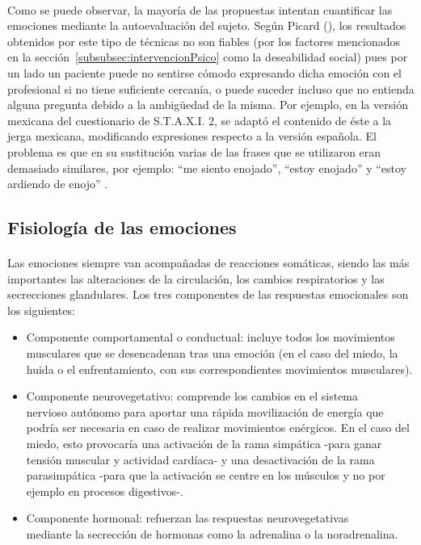 \paragraph{}
Como se puede observar, la mayoría de las propuestas intentan cuantificar las emociones mediante la autoevaluación del sujeto. Según Picard (\citeyear{picard2009future}), los resultados obtenidos por este tipo de técnicas no son fiables (por los factores mencionados en la sección~\ref{subsubsec:intervencionPsico} como la deseabilidad social) pues por un lado un paciente puede no sentirse cómodo expresando dicha emoción con el profesional si no tiene suficiente cercanía, o puede suceder incluso que no entienda alguna pregunta debido a la ambigüedad de la misma. Por ejemplo, en la versión mexicana del cuestionario de S.T.A.X.I. 2, se adaptó el contenido de éste a la jerga mexicana, modificando expresiones respecto a la versión española. El problema es que en su sustitución varias de las frases que se utilizaron eran demasiado similares, por ejemplo: ``me siento enojado'', ``estoy enojado'' y ``estoy ardiendo de enojo'' \citep{oliva2010validacion}.




\subsection{Fisiología de las emociones}
\label{subsec:fisioEmoc}

\paragraph{}
Las emociones siempre van acompañadas de reacciones somáticas, siendo las más importantes las alteraciones de la circulación, los cambios respiratorios y las secrecciones glandulares. Los tres componentes de las respuestas emocionales son los siguientes:

\begin{itemize}
    \item Componente comportamental o conductual: incluye todos los movimientos musculares que se desencadenan tras una emoción (en el caso del miedo, la huida o el enfrentamiento, con sus correspondientes movimientos musculares).
    
    \item Componente neurovegetativo: comprende los cambios en el sistema \\ nervioso autónomo para aportar una rápida movilización de energía que podría ser necesaria en caso de realizar movimientos enérgicos. En el caso del miedo, esto provocaría una activación de la rama simpática -para ganar tensión muscular y actividad cardíaca- y una desactivación de la rama parasimpática -para que la activación se centre en los músculos y no por ejemplo en procesos digestivos-.
    
    \item Componente hormonal: refuerzan las respuestas neurovegetativas \\ mediante la secrección de hormonas como la adrenalina o la noradrenalina.
\end{itemize}

